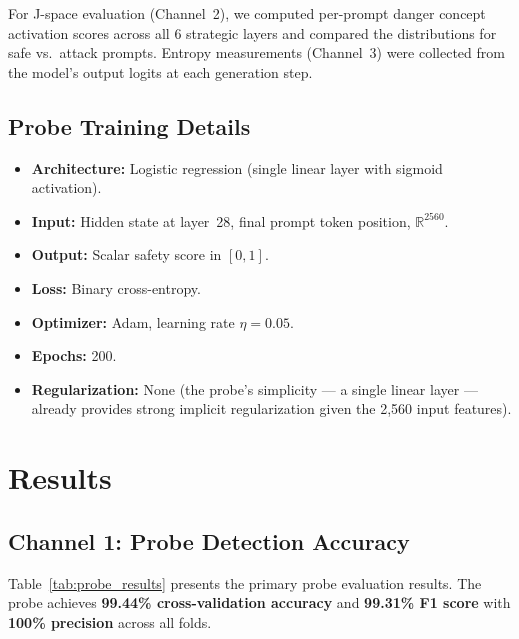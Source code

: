 \documentclass[11pt]{article}
\newcommand{\R}{\mathbb{R}}
\begin{document}
For J-space evaluation (Channel~2), we computed per-prompt danger concept activation scores across all 6 strategic layers and compared the distributions for safe vs.\ attack prompts. Entropy measurements (Channel~3) were collected from the model's output logits at each generation step.

\subsection{Probe Training Details}

\begin{itemize}[nosep]
    \item \textbf{Architecture:} Logistic regression (single linear layer with sigmoid activation).
    \item \textbf{Input:} Hidden state at layer~28, final prompt token position, $\R^{2560}$.
    \item \textbf{Output:} Scalar safety score in $[0, 1]$.
    \item \textbf{Loss:} Binary cross-entropy.
    \item \textbf{Optimizer:} Adam, learning rate $\eta = 0.05$.
    \item \textbf{Epochs:} 200.
    \item \textbf{Regularization:} None (the probe's simplicity — a single linear layer — already provides strong implicit regularization given the 2,560 input features).
\end{itemize}

\section{Results}
\label{sec:results}

\subsection{Channel 1: Probe Detection Accuracy}

Table~\ref{tab:probe_results} presents the primary probe evaluation results. The probe achieves \textbf{99.44\% cross-validation accuracy} and \textbf{99.31\% F1 score} with \textbf{100\% precision} across all folds.
\end{document}
